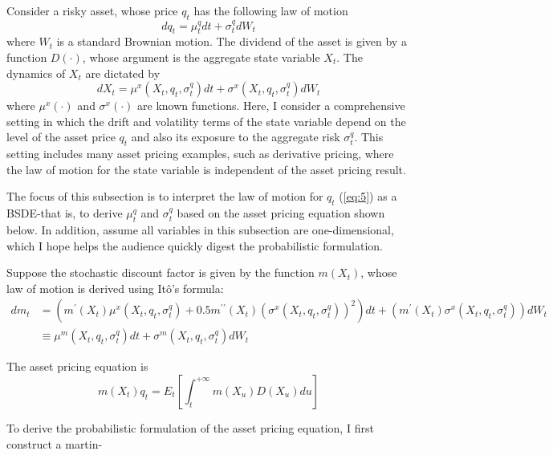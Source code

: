 \documentclass{article}
\begin{document}
Consider a risky asset, whose price $q_{t}$ has the following law of motion
\begin{equation}
dq_{t}=\mu_{t}^{q}dt+\sigma_{t}^{q}dW_{t}
\label{eq:5}
\end{equation}
where $W_{t}$ is a standard Brownian motion. The dividend of the asset is given by a function $D(\cdot)$, whose argument is the aggregate state variable $X_{t}$. The dynamics of $X_{t}$ are dictated by
\[
dX_{t}=\mu^{x}(X_{t},q_{t},\sigma_{t}^{q})dt+\sigma^{x}(X_{t},q_{t},\sigma_{t}^{q})dW_{t}
\]
where $\mu^{x}(\cdot)$ and $\sigma^{x}(\cdot)$ are known functions. Here, I consider a comprehensive setting in which the drift and volatility terms of the state variable depend on the level of the asset price $q_{t}$ and also its exposure to the aggregate risk $\sigma_{t}^{q}$. This setting includes many asset pricing examples, such as derivative pricing, where the law of motion for the state variable is independent of the asset pricing result.

The focus of this subsection is to interpret the law of motion for $q_{t}$ (\ref{eq:5}) as a BSDE-that is, to derive $\mu_{t}^{q}$ and $\sigma_{t}^{q}$ based on the asset pricing equation shown below. In addition, assume all variables in this subsection are one-dimensional, which I hope helps the audience quickly digest the probabilistic formulation.

Suppose the stochastic discount factor is given by the function $m(X_{t})$, whose law of motion is derived using Itô's formula:
\begin{align*}
dm_{t} &= (m^{\prime}(X_{t})\mu^{x}(X_{t},q_{t},\sigma_{t}^{q})+0.5m^{\prime\prime}(X_{t})(\sigma^{x}(X_{t},q_{t},\sigma_{t}^{q}))^{2})dt+(m^{\prime}(X_{t})\sigma^{x}(X_{t},q_{t},\sigma_{t}^{q}))dW_{t} \\
&\equiv \mu^{m}(X_{t},q_{t},\sigma_{t}^{q})dt + \sigma^{m}(X_{t},q_{t},\sigma_{t}^{q})dW_{t}
\end{align*}

The asset pricing equation is
\begin{equation}
m(X_{t})q_{t}=E_{t}\left[\int_{t}^{+\infty}m(X_{u})D(X_{u})du\right]
\label{eq:6}
\end{equation}

To derive the probabilistic formulation of the asset pricing equation, I first construct a martin-

\clearpage
\end{document}

